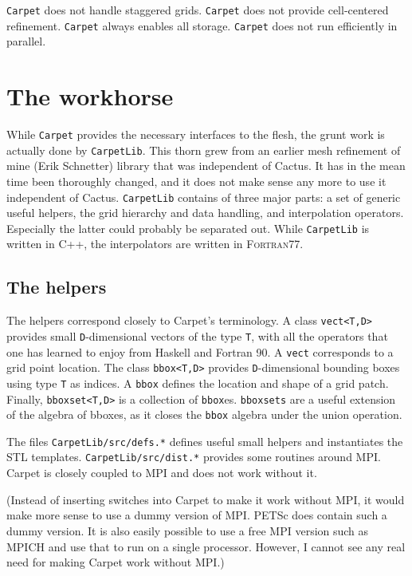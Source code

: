 \documentclass{article}
\begin{document}
   \texttt{Carpet} does not handle staggered grids.  \texttt{Carpet}
   does not provide cell-centered refinement.  \texttt{Carpet} always
   enables all storage.  \texttt{Carpet} does not run efficiently in
   parallel.



\section{The workhorse}

   While \texttt{Carpet} provides the necessary interfaces to the
   flesh, the grunt work is actually done by \texttt{CarpetLib}.  This
   thorn grew from an earlier mesh refinement of mine (Erik Schnetter)
   library that was independent of Cactus.  It has in the mean time
   been thoroughly changed, and it does not make sense any more to use
   it independent of Cactus.  \texttt{CarpetLib} contains of three
   major parts: a set of generic useful helpers, the grid hierarchy
   and data handling, and interpolation operators.  Especially the
   latter could probably be separated out.  While \texttt{CarpetLib}
   is written in C++, the interpolators are written in
   \textsc{Fortran77}.



\subsection{The helpers}

   The helpers correspond closely to Carpet's terminology.  A class
   \texttt{vect<T,D>} provides small \texttt{D}-dimensional vectors of
   the type \texttt{T}, with all the operators that one has learned to
   enjoy from Haskell and Fortran 90.  A \texttt{vect} corresponds to
   a grid point location.  The class \texttt{bbox<T,D>} provides
   \texttt{D}-dimensional bounding boxes using type \texttt{T} as
   indices.  A \texttt{bbox} defines the location and shape of a grid
   patch.  Finally, \texttt{bboxset<T,D>} is a collection of \texttt{bbox}es.
   \texttt{bboxsets} are a useful extension of the algebra of bboxes, as it
   closes the \texttt{bbox} algebra under the union operation.

   The files \texttt{CarpetLib/src/defs.*} defines useful small
   helpers and instantiates the STL templates.
   \texttt{CarpetLib/src/dist.*} provides some routines around MPI.
   Carpet is closely coupled to MPI and does not work without it.

   (Instead of inserting switches into Carpet to make it work without
   MPI, it would make more sense to use a dummy version of MPI.  PETSc
   does contain such a dummy version.  It is also easily possible to
   use a free MPI version such as MPICH and use that to run on a
   single processor.  However, I cannot see any real need for making
   Carpet work without MPI.)
\end{document}
